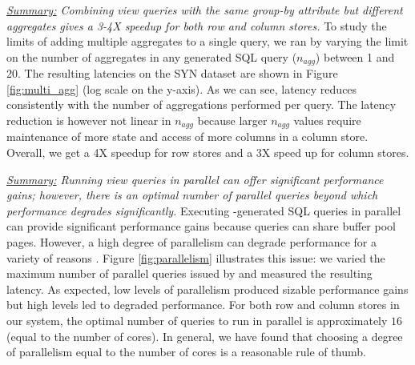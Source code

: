 {\em \underline{Summary:} Combining view queries with the same group-by attribute
but different aggregates gives a 
3-4X speedup for both row and column stores.}
To study the limits of adding multiple aggregates to a single query, we ran \SeeDB
by varying the limit on the number of aggregates in any generated SQL query 
($n_{agg}$) between 1 and 20.
The resulting latencies on the SYN dataset are shown in Figure \ref{fig:multi_agg} (log scale on the y-axis).
As we can see, latency reduces consistently with the number of aggregations performed 
per query.
The latency reduction is however not linear in $n_{agg}$ because
larger $n_{agg}$ values require maintenance of more state and access of more columns in a 
column store.
Overall, we get a 4X speedup for row stores and a 3X speed up for column stores.

{\em \underline{Summary:} Running view queries in parallel can offer significant
performance gains; however, there is an optimal number of parallel queries
beyond which performance degrades significantly.}
Executing \SeeDB-generated SQL queries in parallel can provide significant performance gains
because queries can share buffer pool pages.
However, a high degree of parallelism can degrade performance for a variety of reasons \cite{Postgres_wiki}. 
Figure \ref{fig:parallelism} illustrates this issue: we varied the maximum number of parallel queries
issued by \SeeDB and measured the resulting latency.
As expected, low levels of parallelism produced sizable performance gains but
high levels led to degraded performance.
For both row and column stores in our system, the optimal number of queries to 
run in parallel is approximately $16$ (equal to the number of cores). 
In general, we have found that choosing a degree of parallelism equal to the number of cores
is a reasonable rule of thumb. 

